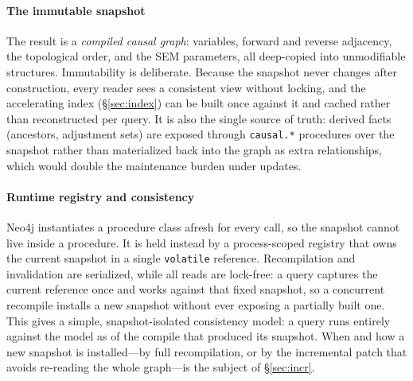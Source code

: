 \paragraph{The immutable snapshot}
The result is a \emph{compiled causal graph}: variables, forward and reverse
adjacency, the topological order, and the SEM parameters, all deep-copied into
unmodifiable structures. Immutability is deliberate. Because the snapshot never
changes after construction, every reader sees a consistent view without locking,
and the accelerating index (\S\ref{sec:index}) can be built once against it and
cached rather than reconstructed per query. It is also the single source of
truth: derived facts (ancestors, adjustment sets) are exposed through
\texttt{causal.*} procedures over the snapshot rather than materialized back into
the graph as extra relationships, which would double the maintenance burden
under updates.

\paragraph{Runtime registry and consistency}
Neo4j instantiates a procedure class afresh for every call, so the snapshot
cannot live inside a procedure. It is held instead by a process-scoped registry
that owns the current snapshot in a single \texttt{volatile} reference.
Recompilation and invalidation are serialized, while all reads are lock-free:
a query captures the current reference once and works against that fixed
snapshot, so a concurrent recompile installs a new snapshot without ever exposing
a partially built one. This gives a simple, snapshot-isolated consistency model:
a query runs entirely against the model as of the compile that produced its
snapshot. When and how a new snapshot is installed---by full recompilation, or by
the incremental patch that avoids re-reading the whole graph---is the subject of
\S\ref{sec:incr}.
